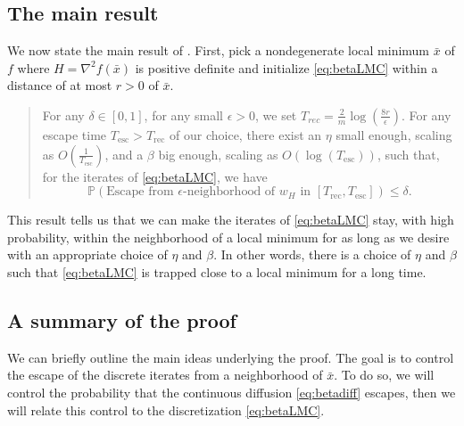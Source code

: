 \documentclass[11pt,twoside]{article}
\theoremstyle{definition}
\newcommand{\Prb}{\mathbb{P}}
\begin{document}
\subsection{The main result}

We now state the main result of \cite{tzen_local_2018}. First, pick a nondegenerate local minimum $\bar{x}$ of $f$ where $H = \nabla^2f(\bar{x})$ is positive definite and initialize \eqref{eq:betaLMC} within a distance of at most $r > 0$ of $\bar{x}$. 

\begin{quote}
\begin{emph}
For any $\delta \in [0, 1]$, for any small $\epsilon >0$, we set $T_{rec} = \frac{2}{m} \log(\frac{8r}{\epsilon})$. For any escape time $T_{\text{esc}} > T_{\text{rec}}$ of our choice, there exist an $\eta$ small enough, scaling as $O(\frac{1}{T_{\text{esc}}})$, and a $\beta$ big enough, scaling as $O(\log(T_{\text{esc}}))$, such that, for the iterates of \eqref{eq:betaLMC}, we have
\[
\Prb(\text{Escape from $\epsilon$-neighborhood of $w_H$ in } [T_{\text{rec}}, T_{\text{esc}}]) \leq \delta.
\]
\end{emph}
\end{quote}

This result tells us that we can make the iterates of \eqref{eq:betaLMC} stay, with high probability, within the neighborhood of a local minimum for as long as we desire with an appropriate choice of $\eta$ and $\beta$. In other words, there is a choice of $\eta$ and $\beta$ such that \eqref{eq:betaLMC} is trapped close to a local minimum for a long time.

\subsection{A summary of the proof}

We can briefly outline the main ideas underlying the proof. The goal is to control the escape of the discrete iterates from a neighborhood of $\bar{x}$. To do so, we will control the probability that the continuous diffusion \eqref{eq:betadiff} escapes, then we will relate this control to the discretization \eqref{eq:betaLMC}.
\end{document}
